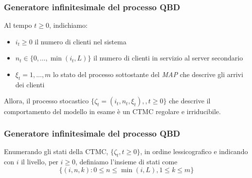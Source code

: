 \documentclass{beamer}
\begin{document}




\begin{frame}
    \frametitle{Generatore infinitesimale del processo QBD}
    Al tempo $t\geq 0$, indichiamo:
    \begin{itemize}
        \item $i_t\geq 0$ il numero di clienti nel sistema
        \item $n_t\in\{0,\ldots,\min(i_t,L)\}$ il numero di clienti in servizio al server secondario
        \item $\xi_t=1,\ldots,m$ lo stato del processo sottostante del \emph{MAP} che descrive gli arrivi dei clienti
    \end{itemize}
    \begin{block}{}
        Allora, il processo stocastico $\{\zeta_t=(i_t,n_t,\xi_t),,t\geq 0\}$ che descrive il comportamento del modello in esame è un CTMC regolare e irriducibile.
    \end{block}
\end{frame}


\begin{frame}
    \frametitle{Generatore infinitesimale del processo QBD}
    \begin{block}{}
        Enumerando gli stati della CTMC, $\{\zeta_t,t\geq 0\}$, in ordine lessicografico e indicando con $i$ il livello, per $i\geq 0$, definiamo l'insieme di stati come
        $$\{(i,n,k):0\leq n\leq \min(i,L),1\leq k\leq m\}$$
    \end{block}
\end{frame}
\end{document}
